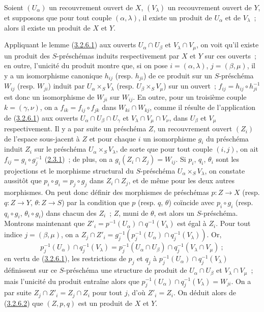 \begin{lemma}[3.2.6.3]
\label{I.3.2.6.3-fr}
Soient $(U_\alpha)$ un recouvrement ouvert de $X$, $(V_\lambda)$ un
recouvrement ouvert de $Y$, et supposons que pour tout couple
$(\alpha,\lambda)$, il existe un produit de $U_\alpha$ et de $V_\lambda$~;
alors il existe un produit de $X$ et $Y$.
\end{lemma}

Appliquant le lemme (\hyperref[I.3.2.6.1-fr]{3.2.6.1}) aux ouverts
$U_\alpha\cap U_\beta$ et $V_\lambda\cap V_\mu$, on voit qu'il existe un
produit des $S$-préschémas induits respectivement par $X$ et $Y$ sur ces
ouverts~; en outre, l'unicité du produit montre que, si on pose
$i=(\alpha,\lambda)$, $j=(\beta,\mu)$, il y a un isomorphisme canonique
$h_{ij}$ (resp. $h_{ji}$) de ce produit sur un $S$-préschéma $W_{ij}$
(resp. $W_{ji}$) induit par $U_\alpha\times_S V_\lambda$
(resp. $U_\beta\times_S V_\mu$) sur un ouvert~;
$f_{ij}=h_{ij}\circ h_{ji}^{-1}$ est donc un isomorphisme de $W_{ji}$ sur
$W_{ij}$. En outre, pour un troisième couple $k=(\gamma,\nu)$, on a
$f_{ik}=f_{ij}\circ f_{jk}$ dans $W_{ki}\cap W_{kj}$, comme il résulte de
l'application de (\hyperref[I.3.2.6.1-fr]{3.2.6.1}) aux ouverts
$U_\alpha\cap U_\beta\cap U_\gamma$ et
$V_\lambda\cap V_\mu\cap V_\nu$, dans $U_\beta$ et $V_\mu$
respectivement. Il y a par suite un préschéma $Z$, un recouvrement ouvert
$(Z_i)$ de l'espace sous-jacent à $Z$ et pour chaque $i$ un isomorphisme $g_i$
du préschéma induit $Z_i$ sur le préschéma
$U_\alpha\times_S V_\lambda$, de sorte que pour tout couple $(i,j)$, on ait
$f_{ij}=g_i\circ g_j^{-1}$
(\hyperref[I.2.3.1-fr]{2.3.1})~; de plus, on a
$g_i(Z_i\cap Z_j)=W_{ij}$. Si $p_i$, $q_i$, $\theta_i$ sont les projections
et le morphisme structural du $S$-préschéma
$U_\alpha\times_S V_\lambda$, on constate aussitôt que
$p_i\circ g_i=p_j\circ g_j$ dans $Z_i\cap Z_j$, et de même pour les deux
autres morphismes. On peut donc définir des morphismes de préschémas
$p:Z\to X$ (resp. $q:Z\to Y$, $\theta:Z\to S$) par la condition que $p$
(resp. $q$, $\theta$) coïncide avec $p_i\circ g_i$
(resp. $q_i\circ g_i$, $\theta_i\circ g_i$) dans chacun des $Z_i$~; $Z$,
muni de $\theta$, est alors un $S$-préschéma. Montrons maintenant que
$Z'_i=p^{-1}(U_\alpha)\cap q^{-1}(V_\lambda)$ est égal à $Z_i$. Pour tout
indice $j=(\beta,\mu)$, on a
$Z_j\cap Z'_i=g_j^{-1}(p_j^{-1}(U_\alpha)\cap q_j^{-1}(V_\lambda))$. Or,
\[
  p_j^{-1}(U_\alpha)\cap q_j^{-1}(V_\lambda)
  =p_j^{-1}(U_\alpha\cap U_\beta)\cap
   q_j^{-1}(V_\lambda\cap V_\mu)~;
\]
en vertu de (\hyperref[I.3.2.6.1-fr]{3.2.6.1}), les restrictions de $p_j$ et
$q_j$ à
$p_j^{-1}(U_\alpha)\cap q_j^{-1}(V_\lambda)$ définissent sur ce
$S$-préschéma une structure de produit de $U_\alpha\cap U_\beta$ et
$V_\lambda\cap V_\mu$~; mais l'unicité du produit entraîne alors que
$p_j^{-1}(U_\alpha)\cap q_j^{-1}(V_\lambda)=W_{ji}$. On a par suite
$Z_j\cap Z'_i=Z_j\cap Z_i$ pour tout $j$, d'où $Z'_i=Z_i$. On déduit alors
de (\hyperref[I.3.2.6.2-fr]{3.2.6.2}) que $(Z,p,q)$ est un produit de $X$ et
$Y$.

